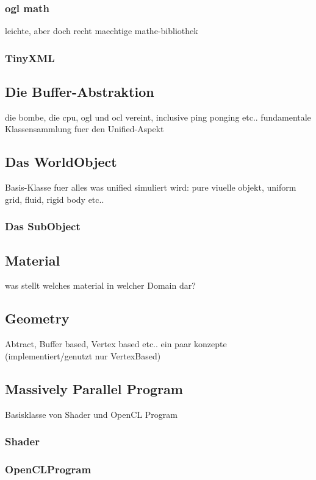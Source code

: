     \subsubsection{ogl math}
    	leichte, aber doch recht maechtige mathe-bibliothek
    \subsubsection{TinyXML}
    	
    	
\subsection{Die Buffer-Abstraktion}   	
 	die bombe, die cpu, ogl und ocl vereint, inclusive ping ponging etc.. fundamentale Klassensammlung fuer den Unified-Aspekt
 
\subsection{Das WorldObject}
	Basis-Klasse fuer alles was unified simuliert wird: pure viuelle objekt, uniform grid, fluid, rigid body etc..
	
	\subsubsection{Das SubObject}
  
 
\subsection{Material}  
	was stellt welches material in welcher Domain dar?
	
\subsection{Geometry}
	Abtract, Buffer based, Vertex based etc.. ein paar konzepte (implementiert/genutzt nur VertexBased)  
	
\subsection{Massively Parallel Program}
	Basisklasse von Shader und OpenCL Program
	\subsubsection{Shader}
		
	\subsubsection{OpenCLProgram}

